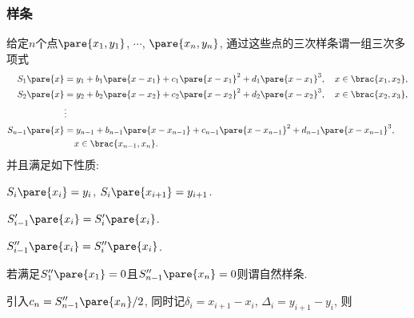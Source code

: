 \documentclass{ctexart}
\begin{document}
\subsubsection{样条} %
\label{ssub:样条}

给定$n$个点$\pare{x_1,y_1}$, $\cdots$, $\pare{x_n,y_n}$, 通过这些点的三次样条谓一组三次多项式
\begin{align*}
    S_1\pare{x} &= y_1 + b_1\pare{x-x_1} + c_1\pare{x-x_1}^2 + d_1\pare{x-x_1}^3,\quad x\in\brac{x_1,x_2}, \\
    S_2\pare{x} &= y_2 + b_2\pare{x-x_2} + c_2\pare{x-x_2}^2 + d_2\pare{x-x_2}^3,\quad x\in\brac{x_2,x_3}, \\
    &\vdots \\
    S_{n-1}\pare{x} &= y_{n-1} + b_{n-1}\pare{x - x_{n-1}} + c_{n-1}\pare{x-x_{n-1}}^2 + d_{n-1}\pare{x-x_{n-1}}^3, \\ &\phantom{=\ } x\in\brac{x_{n-1},x_n}.
\end{align*}
并且满足如下性质:
\begin{cenum}
    \item $S_i\pare{x_i} = y_i$, $S_i\pare{x_{i+1}} = y_{i+1}$.
    \item $S'_{i-1}\pare{x_i} = S'_i\pare{x_i}$.
    \item $S''_{i-1}\pare{x_i} = S''_i\pare{x_i}$.
\end{cenum}
若满足$S''_1\pare{x_1} = 0$且$S''_{n-1}\pare{x_n} = 0$则谓自然样条.
\par
引入$c_n = S''_{n-1}\pare{x_n}/2$, 同时记$\delta_i = x_{i+1} - x_i$, $\Delta_i = y_{i+1} - y_i$, 则
\end{document}

